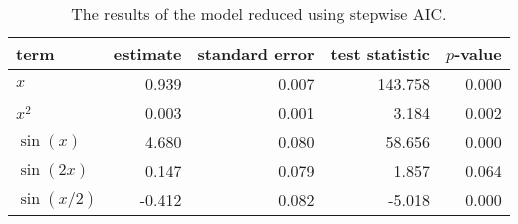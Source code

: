 \begin{table}[t]

\caption{\label{tab:stepwise-regression}The results of the model reduced using stepwise \ac{AIC}.}
\centering
\begin{tabular}{lrrrr}
\toprule
term & estimate & standard error & test statistic & \(p\)-value\\
\midrule
\(x\) & 0.939 & 0.007 & 143.758 & 0.000\\
\(x^2\) & 0.003 & 0.001 & 3.184 & 0.002\\
\(\sin(x)\) & 4.680 & 0.080 & 58.656 & 0.000\\
\(\sin(2x)\) & 0.147 & 0.079 & 1.857 & 0.064\\
\(\sin(x/2)\) & -0.412 & 0.082 & -5.018 & 0.000\\
\bottomrule
\end{tabular}
\end{table}